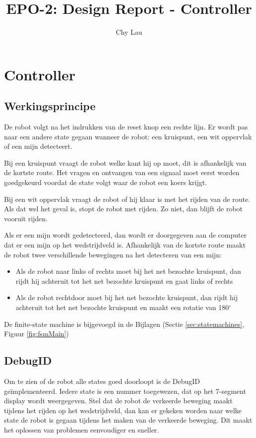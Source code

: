 \documentclass{report}
\title{EPO-2: Design Report - Controller}
\author{Chy Lau}
\begin{document}
\chapter{Controller}
\label{ch:controller}

\section{Werkingsprincipe}
De robot volgt na het indrukken van de reset knop een rechte lijn.
Er wordt pas naar een andere state gegaan wanneer de robot: een kruispunt, een wit oppervlak of een mijn detecteert.


Bij een kruispunt vraagt de robot welke kant hij op moet, dit is afhankelijk van de kortste route.
Het vragen en ontvangen van een signaal moet eerst worden goedgekeurd voordat de state volgt waar de robot een koers krijgt.


Bij een wit oppervlak vraagt de robot of hij klaar is met het rijden van de route.
Als dat wel het geval is, stopt de robot met rijden.
Zo niet, dan blijft de robot vooruit rijden.

Als er een mijn wordt gedetecteerd, dan wordt er doorgegeven aan de computer dat er een mijn op het wedstrijdveld is. 
Afhankelijk van de kortste route maakt de robot twee verschillende bewegingen na het detecteren van een mijn:
\begin{itemize}
\item Als de robot naar links of rechts moet bij het net bezochte kruispunt, dan rijdt hij achteruit tot het net bezochte kruispunt en gaat links of rechts
\item Als de robot rechtdoor moet bij het net bezochte kruispunt, dan rijdt hij achteruit tot het net bezochte kruispunt en maakt een rotatie van 180$^\circ$
\end{itemize}

De finite-state machine is bijgevoegd in de Bijlagen (Sectie \ref{sec:statemachines}, Figuur \ref{fig:fsmMain})

\section{DebugID}
Om te zien of de robot alle states goed doorloopt is de DebugID ge\"{i}mplementeerd.
Iedere state is een nummer toegewezen, dat op het 7-segment display wordt weergegeven.
Stel dat de robot de verkeerde beweging maakt tijdens het rijden op het wedstrijdveld, dan kan er gekeken worden naar welke state de robot is gegaan tijdens het maken van de verkeerde beweging.
Dit maakt het oplossen van problemen eenvoudiger en sneller.
\end{document}
